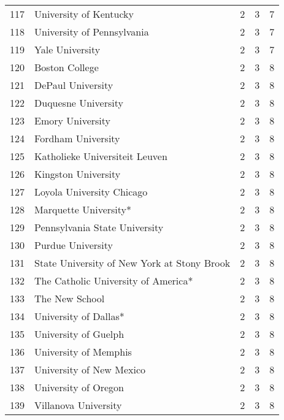\begin{longtable}{rllll}
  117 & University of Kentucky & 2 & 3 & 7 \\ 
  118 & University of Pennsylvania & 2 & 3 & 7 \\ 
  119 & Yale University & 2 & 3 & 7 \\ 
  120 & Boston College & 2 & 3 & 8 \\ 
  121 & DePaul University & 2 & 3 & 8 \\ 
  122 & Duquesne University & 2 & 3 & 8 \\ 
  123 & Emory University & 2 & 3 & 8 \\ 
  124 & Fordham University & 2 & 3 & 8 \\ 
  125 & Katholieke Universiteit Leuven & 2 & 3 & 8 \\ 
  126 & Kingston University & 2 & 3 & 8 \\ 
  127 & Loyola University Chicago & 2 & 3 & 8 \\ 
  128 & Marquette University* & 2 & 3 & 8 \\ 
  129 & Pennsylvania State University & 2 & 3 & 8 \\ 
  130 & Purdue University & 2 & 3 & 8 \\ 
  131 & State University of New York at Stony Brook & 2 & 3 & 8 \\ 
  132 & The Catholic University of America* & 2 & 3 & 8 \\ 
  133 & The New School & 2 & 3 & 8 \\ 
  134 & University of Dallas* & 2 & 3 & 8 \\ 
  135 & University of Guelph & 2 & 3 & 8 \\ 
  136 & University of Memphis & 2 & 3 & 8 \\ 
  137 & University of New Mexico & 2 & 3 & 8 \\ 
  138 & University of Oregon & 2 & 3 & 8 \\ 
  139 & Villanova University & 2 & 3 & 8 \\ 
   \hline
\hline
\end{longtable}
